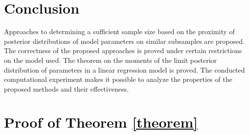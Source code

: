 \documentclass[runningheads]{llncs}
\begin{document}
\section{Conclusion}

Approaches to determining a sufficient sample size based on the proximity of posterior distributions of model parameters on similar subsamples are proposed. The correctness of the proposed approaches is proved under certain restrictions on the model used. The theorem on the moments of the limit posterior distribution of parameters in a linear regression model is proved. The conducted computational experiment makes it possible to analyze the properties of the proposed methods and their effectiveness.

%
%
%
\clearpage


%

\clearpage
\appendix

\section{Proof of Theorem \ref{theorem}}
\end{document}
